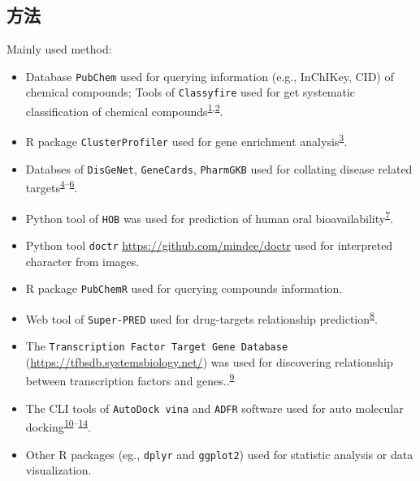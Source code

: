 \documentclass[
]{article}
\providecommand{\tightlist}{%
  \setlength{\itemsep}{0pt}\setlength{\parskip}{0pt}}
\begin{document}
\hypertarget{ux65b9ux6cd5}{%
\subsection{方法}\label{ux65b9ux6cd5}}

Mainly used method:

\begin{itemize}
\tightlist
\item
  Database \texttt{PubChem} used for querying information (e.g., InChIKey, CID) of chemical compounds; Tools of \texttt{Classyfire} used for get systematic classification of chemical compounds\textsuperscript{\protect\hyperlink{ref-PubchemSubstanKimS2015}{1},\protect\hyperlink{ref-ClassyfireAutDjoumb2016}{2}}.
\item
  R package \texttt{ClusterProfiler} used for gene enrichment analysis\textsuperscript{\protect\hyperlink{ref-ClusterprofilerWuTi2021}{3}}.
\item
  Databses of \texttt{DisGeNet}, \texttt{GeneCards}, \texttt{PharmGKB} used for collating disease related targets\textsuperscript{\protect\hyperlink{ref-TheDisgenetKnPinero2019}{4}--\protect\hyperlink{ref-PharmgkbAWorBarbar2018}{6}}.
\item
  Python tool of \texttt{HOB} was used for prediction of human oral bioavailability\textsuperscript{\protect\hyperlink{ref-HobpreAccuratWeiM2022}{7}}.
\item
  Python tool \texttt{doctr} \url{https://github.com/mindee/doctr} used for interpreted character from images.
\item
  R package \texttt{PubChemR} used for querying compounds information.
\item
  Web tool of \texttt{Super-PRED} used for drug-targets relationship prediction\textsuperscript{\protect\hyperlink{ref-SuperpredUpdaNickel2014}{8}}.
\item
  The \texttt{Transcription\ Factor\ Target\ Gene\ Database} (\url{https://tfbsdb.systemsbiology.net/}) was used for discovering relationship between transcription factors and genes..\textsuperscript{\protect\hyperlink{ref-CausalMechanisPlaisi2016}{9}}
\item
  The CLI tools of \texttt{AutoDock\ vina} and \texttt{ADFR} software used for auto molecular docking\textsuperscript{\protect\hyperlink{ref-AutodockVina1Eberha2021}{10}--\protect\hyperlink{ref-AutodockfrAdvRavind2015}{14}}.
\item
  Other R packages (eg., \texttt{dplyr} and \texttt{ggplot2}) used for statistic analysis or data visualization.
\end{itemize}
\end{document}
